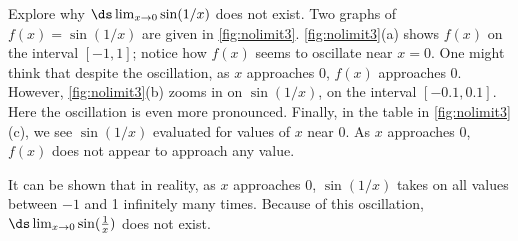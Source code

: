 \begin{example}\label{ex_no_limit3}
Explore why $\ds\lim_{x\to 0}\sin(1/x)$ does not exist.
\solution
Two graphs of $f(x) = \sin(1/x)$ are given in \autoref{fig:nolimit3}. \autoref{fig:nolimit3}(a) shows $f(x)$ on the interval $[-1,1]$; notice how $f(x)$ seems to oscillate near $x=0$. One might think that despite the oscillation, as $x$ approaches 0, $f(x)$ approaches 0. However, \autoref{fig:nolimit3}(b) zooms in on $\sin(1/x)$, on the interval $[-0.1,0.1]$. Here the oscillation is even more pronounced. Finally, in the table in \autoref{fig:nolimit3}(c), we see $\sin(1/x)$ evaluated for values of $x$ near 0. As $x$ approaches 0, $f(x)$ does not appear to approach any value. 

It can be shown that in reality, as $x$ approaches 0, $\sin(1/x)$ takes on all values between $-1$ and 1 infinitely many times. Because of this oscillation,
$\ds\lim_{x\to 0}\sin(\frac1x)$ does not exist.
\end{example}

